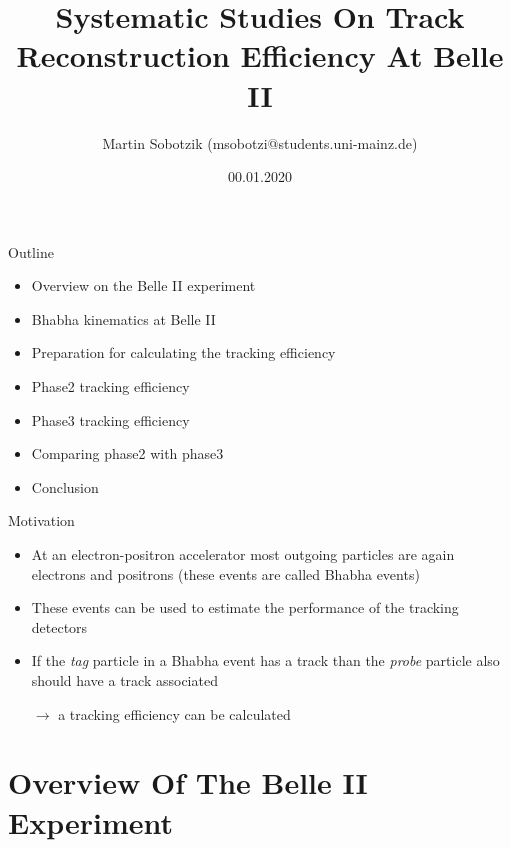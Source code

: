 \documentclass[8pt]{beamer}
\title{Systematic Studies On Track Reconstruction Efficiency At Belle II}
\date{00.01.2020}
\author{Martin Sobotzik (msobotzi@students.uni-mainz.de)}
\institute{Johannes Gutenberg-Universit\"at Mainz}
\begin{document}
\maketitle
%




\begin{frame}{Outline}




	\begin{itemize}
		\item Overview on the Belle II experiment
		\item Bhabha kinematics at Belle II
		\item Preparation for calculating the tracking efficiency
		\item Phase2 tracking efficiency
		\item Phase3 tracking efficiency
		\item Comparing phase2 with phase3
		\item Conclusion
		
		
	\end{itemize}
\end{frame}



\begin{frame}{Motivation}
	\begin{itemize}
		\item At an electron-positron accelerator most outgoing particles are again electrons and positrons (these events are called Bhabha events)
		\item These events can be used to estimate the performance of the tracking detectors
		\item If the \textit{tag} particle in a Bhabha event has a track than the \textit{probe} particle also should have a track associated 
		
		$\rightarrow$ a tracking efficiency can be calculated
	\end{itemize}
\end{frame}


\section{Overview Of The Belle II Experiment}
\end{document}
